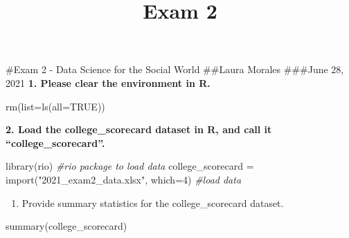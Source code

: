 \documentclass[
]{article}
\title{Exam 2}
\author{}
\date{\vspace{-2.5em}}
\newenvironment{Shaded}{\begin{snugshade}}{\end{snugshade}}
\newcommand{\AttributeTok}[1]{\textcolor[rgb]{0.77,0.63,0.00}{#1}}
\newcommand{\CommentTok}[1]{\textcolor[rgb]{0.56,0.35,0.01}{\textit{#1}}}
\newcommand{\ConstantTok}[1]{\textcolor[rgb]{0.00,0.00,0.00}{#1}}
\newcommand{\DecValTok}[1]{\textcolor[rgb]{0.00,0.00,0.81}{#1}}
\newcommand{\FunctionTok}[1]{\textcolor[rgb]{0.00,0.00,0.00}{#1}}
\newcommand{\NormalTok}[1]{#1}
\newcommand{\OtherTok}[1]{\textcolor[rgb]{0.56,0.35,0.01}{#1}}
\newcommand{\StringTok}[1]{\textcolor[rgb]{0.31,0.60,0.02}{#1}}
\providecommand{\tightlist}{%
  \setlength{\itemsep}{0pt}\setlength{\parskip}{0pt}}
\begin{document}
\maketitle

\#Exam 2 - Data Science for the Social World \#\#Laura Morales
\#\#\#June 28, 2021 \textbf{1. Please clear the environment in R.}

\begin{Shaded}
\begin{Highlighting}[]
\FunctionTok{rm}\NormalTok{(}\AttributeTok{list=}\FunctionTok{ls}\NormalTok{(}\AttributeTok{all=}\ConstantTok{TRUE}\NormalTok{))}
\end{Highlighting}
\end{Shaded}

\textbf{2. Load the college\_scorecard dataset in R, and call it
``college\_scorecard''.}

\begin{Shaded}
\begin{Highlighting}[]
\FunctionTok{library}\NormalTok{(rio) }\CommentTok{\#rio package to load data}
\NormalTok{college\_scorecard }\OtherTok{=} \FunctionTok{import}\NormalTok{(}\StringTok{"2021\_exam2\_data.xlsx"}\NormalTok{, }\AttributeTok{which=}\DecValTok{4}\NormalTok{) }\CommentTok{\#load data}
\end{Highlighting}
\end{Shaded}

\begin{enumerate}
\def\labelenumi{\arabic{enumi}.}
\setcounter{enumi}{2}
\tightlist
\item
  Provide summary statistics for the college\_scorecard dataset.
\end{enumerate}

\begin{Shaded}
\begin{Highlighting}[]
\FunctionTok{summary}\NormalTok{(college\_scorecard)}
\end{Highlighting}
\end{Shaded}
\end{document}
